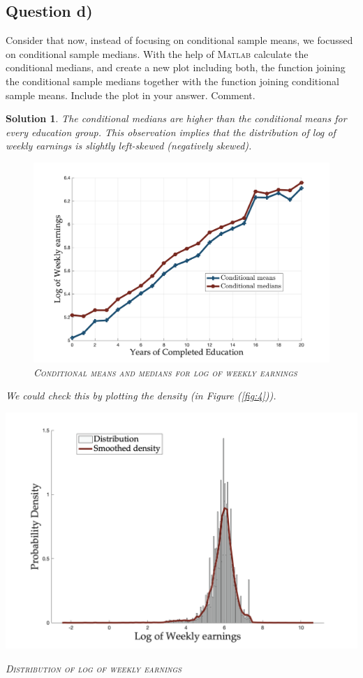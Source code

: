 \documentclass[9pt]{tufte-handout}
\newcommand{\problem}[1]{{\color{gray} #1}}
\newcommand{\solution}[1]{{\color{NavyBlue} #1}}
\newcommand{\qedblack}{\hfill \blacksquare}
\newtheorem*{Solution}{Solution}
\begin{document}
\subsection{Question d)}
\problem{Consider that now, instead of focusing on conditional sample means, we focussed on conditional sample medians. With the help of \textsc{Matlab} calculate the conditional medians, and create a new plot including both, the function joining the conditional sample medians together with the function joining conditional sample means. Include the plot in your answer. Comment.
}
\solution{\begin{Solution}
	\normalfont
	\fbox{\textsc{Comment}:} The conditional medians are higher than the conditional means for every education group. This observation implies that the distribution of log of weekly earnings is slightly left-skewed (negatively skewed). \\
	\begin{figure}
		\includegraphics[scale = 0.24]{1d).png}
		\caption{\textsc{Conditional means and medians for log of weekly earnings}}
		\label{fig:3}
	\end{figure}
	We could check this by plotting the density (in Figure (\ref{fig:4})).
	\begin{marginfigure}
		\includegraphics[scale = 0.14]{1d_extra.png}
		\caption{\textsc{Distribution of log of weekly earnings}}
		\label{fig:4}
	\end{marginfigure}
	\qedblack
\end{Solution}
}
\end{document}
